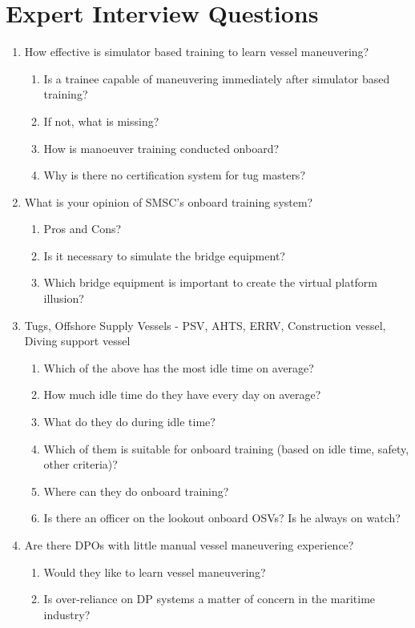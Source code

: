 \section{Expert Interview Questions}
\begin{enumerate}
	\item How effective is simulator based training to learn vessel maneuvering?
	\begin{enumerate}
		\item Is a trainee capable of maneuvering immediately after simulator based training?
		\item If not, what is missing?
		\item How is manoeuver training conducted onboard? 
		\item Why is there no certification system for tug masters? 
	\end{enumerate}

	\item What is your opinion of SMSC's onboard training system? 
	\begin{enumerate}
		\item Pros and Cons?
		\item Is it necessary to simulate the bridge equipment?
		\item Which bridge equipment is important to create the virtual platform illusion? 
	\end{enumerate}

	\item Tugs, Offshore Supply Vessels - PSV, AHTS, ERRV, Construction vessel, Diving support vessel
	\begin{enumerate}
		\item Which of the above has the most idle time on average?
		\item How much idle time do they have every day on average?
		\item What do they do during idle time? 
		\item Which of them is suitable for onboard training (based on idle time, safety, other criteria)?
		\item Where can they do onboard training?
		\item Is there an officer on the lookout onboard OSVs? Is he always on watch? 
	\end{enumerate}

	\item Are there DPOs with little manual vessel maneuvering experience? 
	\begin{enumerate}
		\item Would they like to learn vessel maneuvering? 
		\item Is over-reliance on DP systems a matter of concern in the maritime industry?
	\end{enumerate}


\end{enumerate}

